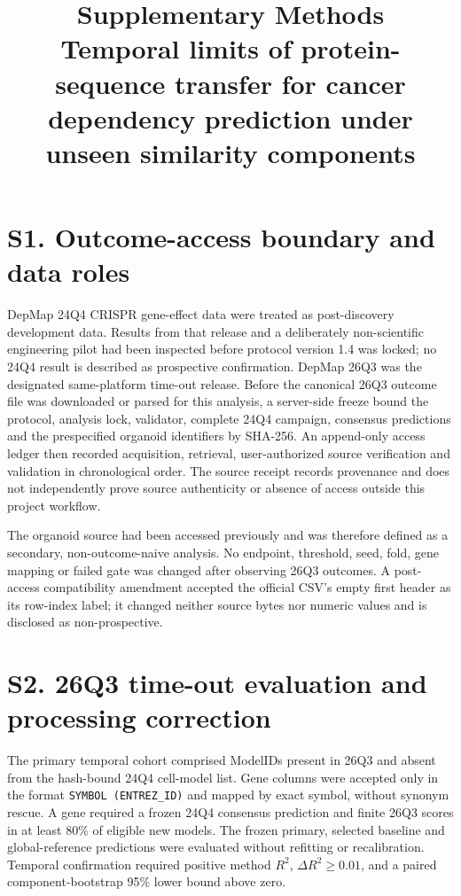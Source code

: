 \documentclass[11pt]{article}
\title{Supplementary Methods\\Temporal limits of protein-sequence transfer for cancer dependency prediction under unseen similarity components}
\date{}
\begin{document}
\maketitle
\small

\section*{S1. Outcome-access boundary and data roles}

DepMap 24Q4 CRISPR gene-effect data were treated as post-discovery development
data. Results from that release and a deliberately non-scientific engineering
pilot had been inspected before protocol version 1.4 was locked; no 24Q4 result
is described as prospective confirmation. DepMap 26Q3 was the designated
same-platform time-out release. Before the canonical 26Q3 outcome file was
downloaded or parsed for this analysis, a server-side freeze bound the protocol,
analysis lock, validator, complete 24Q4 campaign, consensus predictions and the
prespecified organoid identifiers by SHA-256. An append-only access ledger then
recorded acquisition, retrieval, user-authorized source verification and
validation in chronological order. The source receipt records provenance and
does not independently prove source authenticity or absence of access outside
this project workflow.

The organoid source had been accessed previously and was therefore defined as a
secondary, non-outcome-naive analysis. No endpoint, threshold, seed, fold, gene
mapping or failed gate was changed after observing 26Q3 outcomes. A post-access
compatibility amendment accepted the official CSV's empty first header as its
row-index label; it changed neither source bytes nor numeric values and is
disclosed as non-prospective.

\section*{S2. 26Q3 time-out evaluation and processing correction}

The primary temporal cohort comprised ModelIDs present in 26Q3 and absent from
the hash-bound 24Q4 cell-model list. Gene columns were accepted only in the
format \texttt{SYMBOL (ENTREZ\_ID)} and mapped by exact symbol, without synonym
rescue. A gene required a frozen 24Q4 consensus prediction and finite 26Q3
scores in at least 80\% of eligible new models. The frozen primary, selected
baseline and global-reference predictions were evaluated without refitting or
recalibration. Temporal confirmation required positive method $R^2$,
$\Delta R^2\geq0.01$, and a paired component-bootstrap 95\% lower bound above
zero.
\end{document}
